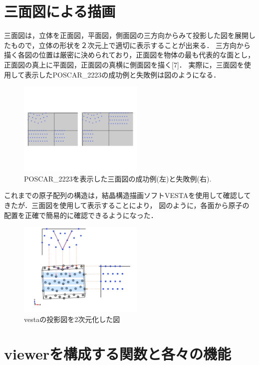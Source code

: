 
\section{三面図による描画}
三面図は，立体を正面図，平面図，側面図の三方向からみて投影した図を展開したもので，立体の形状を２次元上で適切に表示することが出来る．
三方向から描く各図の位置は厳密に決められており，正面図を物体の最も代表的な面とし，正面図の真上に平面図，正面図の真横に側面図を描く[7]．
実際に，三面図を使用して表示したPOSCAR\_2223の成功例と失敗例は図のようになる．

\begin{figure}[htbp]\begin{center}
\includegraphics[width=6cm,bb=0 0 442 500]{../figs/./boundary_narita.014.jpg}
\caption{POSCAR\_2223を表示した三面図の成功例(左)と失敗例(右).}
\label{default}\end{center}\end{figure}
これまでの原子配列の構造は，結晶構造描画ソフトVESTAを使用して確認してきたが．三面図を使用して表示することにより，
図のように，各面から原子の配置を正確で簡易的に確認できるようになった．

\begin{figure}[htbp]\begin{center}
\includegraphics[width=6cm,bb=0 0 442 500]{../figs/./boundary_narita.007.jpg}
\caption{vestaの投影図を2次元化した図}
\label{default}\end{center}\end{figure}
\section{viewerを構成する関数と各々の機能}
